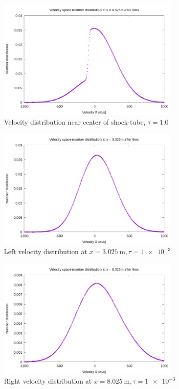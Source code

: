 \documentclass[paper=a4, fontsize=12pt]{scrartcl}
\begin{document}
\begin{figure}[H]
        \centering
        \includegraphics[width=0.8\textwidth]{center_shock-t}
        \caption{Velocity distribution near center of shock-tube, $\tau = 1.0$}
        \label{fig:center_shock-t}
\end{figure}
\begin{figure}[H]
        \centering
        \includegraphics[width=0.8\textwidth]{left_f}
        \caption{Left velocity distribution at $x = \SI{3.025}{\meter}, \tau = \SI{1e-3}{}$ }
        \label{fig:left_f}
\end{figure}
\begin{figure}[H]
        \centering
        \includegraphics[width=0.8\textwidth]{right_f}
        \caption{Right velocity distribution at $x = \SI{8.025}{\meter}, \tau = \SI{1e-3}{}$ }
        \label{fig:right_f}
\end{figure}
\end{document}
